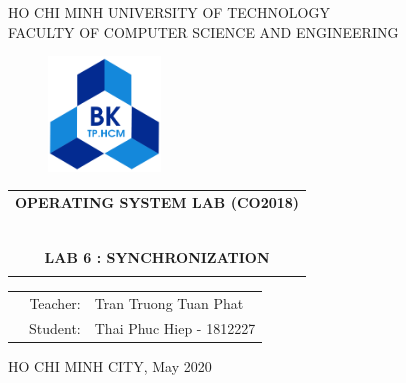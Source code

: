 \documentclass[a4paper]{article}
\begin{document}
\begin{titlepage}
\begin{center}
HO CHI MINH UNIVERSITY OF TECHNOLOGY \\
FACULTY OF COMPUTER SCIENCE AND ENGINEERING 
\end{center}

\vspace{1cm}

\begin{figure}[h!]
\begin{center}
\includegraphics[width=3cm]{hcmut.png}
\end{center}
\end{figure}

\vspace{1cm}


\begin{center}
\begin{tabular}{c}
\multicolumn{1}{c}{\textbf{{\Large OPERATING SYSTEM LAB (CO2018)}}}\\
~~\\
\hline
\\
\textbf{{\Huge LAB 6 : SYNCHRONIZATION}}\\
\\
\hline
\end{tabular}
\end{center}

\vspace{3cm}

\begin{table}[h]
\begin{tabular}{rrl}
\hspace{5 cm} & Teacher: & Tran Truong Tuan Phat\\
& Student: & Thai Phuc Hiep - 1812227 \\
\end{tabular}
\end{table}

\vspace{4.7cm}

\begin{center}
{\footnotesize HO CHI MINH CITY, May 2020}
\end{center}
\end{titlepage}
\end{document}

